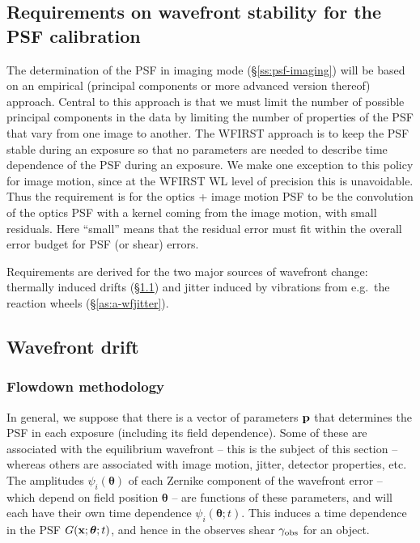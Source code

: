 \documentclass[aps,prd, amsmath,amssymb,superscriptaddress,showkeys,nofootinbib,reprint,preprintnumbers]{revtex4-1}
\begin{document}
\begin{widetext}
\section{Requirements on wavefront stability for the PSF calibration}
\label{app:psf-stability}

The determination of the PSF in imaging mode (\S\ref{ss:psf-imaging})
will be based on an empirical (principal components or more advanced
version thereof) approach. Central to this approach is that we must
limit the number of possible principal components in the data by
limiting the number of properties of the PSF that vary from one image
to another. The WFIRST approach is to keep the PSF stable during an
exposure so that no parameters are needed to describe time dependence
of the PSF during an exposure. We make one exception to this policy
for image motion, since at the WFIRST WL level of precision this is
unavoidable. Thus the requirement is for the optics + image motion PSF
to be the convolution of the optics PSF with a kernel coming from the
image motion, with small residuals. Here ``small'' means that the
residual error must fit within the overall error budget for PSF (or
shear) errors.

Requirements are derived for the two major sources of wavefront
change: thermally induced drifts (\S\ref{as:a-drift}) and jitter
induced by vibrations from e.g.\ the reaction wheels
(\S\ref{as:a-wfjitter}).

\subsection{Wavefront drift}
\label{as:a-drift}

\subsubsection{Flowdown methodology}
\label{as:drift-method}

In general, we suppose that there is a vector of parameters ${\bf p}$
that determines the PSF in each exposure (including its field
dependence). Some of these are associated with the equilibrium
wavefront -- this is the subject of this section -- whereas others are
associated with image motion, jitter, detector properties, etc. The
amplitudes $\psi_i({\boldsymbol\theta})$ of each Zernike component of
the wavefront error -- which depend on field position
${\boldsymbol\theta}$ -- are functions of these parameters, and will
each have their own time dependence
$\psi_i({\boldsymbol\theta};t)$. This induces a time dependence in the
PSF $G({\bf x};{\boldsymbol\theta};t)$, and hence in the observes
shear $\gamma_{\rm obs}$ for an object.


\end{widetext}
\end{document}
